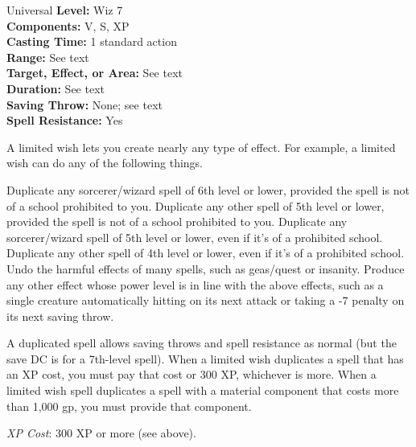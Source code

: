 {Universal}
{
	\textbf{Level:}
	Wiz 7\\
	\textbf{Components:}
	V, S, XP\\
	\textbf{Casting Time:}
	1 standard action\\
	\textbf{Range:}
	See text\\
	\textbf{Target, Effect, or Area:}
	See text\\
	\textbf{Duration:}
	See text\\
	\textbf{Saving Throw:}
	None; see text\\
	\textbf{Spell Resistance:}
	Yes\\
}
{
	A limited wish lets you create nearly any type of effect. For example, a limited wish can do any of the following things.


Duplicate any sorcerer/wizard spell of 6th level or lower, provided the spell is not of a school prohibited to you.
Duplicate any other spell of 5th level or lower, provided the spell is not of a school prohibited to you.
Duplicate any sorcerer/wizard spell of 5th level or lower, even if it's of a prohibited school.
Duplicate any other spell of 4th level or lower, even if it's of a prohibited school.
Undo the harmful effects of many spells, such as geas/quest or insanity.
Produce any other effect whose power level is in line with the above effects, such as a single creature automatically hitting on its next attack or taking a -7 penalty on its next saving throw.

	A duplicated spell allows saving throws and spell resistance as normal (but the save DC is for a 7th-level spell). When a limited wish duplicates a spell that has an XP cost, you must pay that cost or 300 XP, whichever is more. When a limited wish spell duplicates a spell with a material component that costs more than 1,000 gp, you must provide that component.

	\textit{XP Cost}:
	300 XP or more (see above).

}
